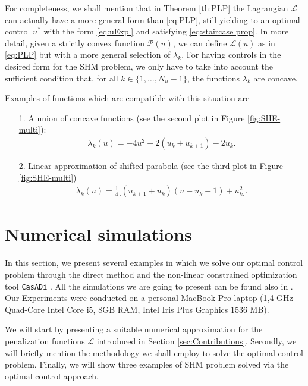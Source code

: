 \documentclass[twocolumn]{autart}    %
\begin{document}
\begin{remark}

For completeness, we shall mention that in Theorem \ref{th:PLP} the Lagrangian $\mathcal L$ can actually have a more general form than \eqref{eq:PLP}, still yielding to an optimal control $u^\ast$ with the form \eqref{eq:uExpl} and satisfying \eqref{eq:staircase prop}. In more detail, given a strictly convex function $\mathcal{P}(u)$, we can define $\mathcal{L}(u)$ as in \eqref{eq:PLP} but with a more general selection of  $\lambda_k$. For having controls in the desired form for the SHM problem, we only have to take into account the sufficient condition that, for all $k \in \{1,\dots,N_u-1\}$, the functions $\lambda_k$ are concave.

Examples of functions which are compatible with this situation are
\begin{enumerate}
    \item[1.] A union of concave functions (see the second plot in Figure \ref{fig:SHE-multi}):
    \begin{align*}
        \lambda_k(u) = -4u^2 + 2(u_k + u_{k+1}) - 2u_{k}.
    \end{align*}
    \item[2.] Linear approximation of shifted parabola (see the third plot in Figure \ref{fig:SHE-multi})
    \begin{align*}
        \lambda_k(u) = \frac 1 4\Big[(u_{k+1}+u_{k}) (u-u_k-1) + u_k^2\Big].
    \end{align*}
\end{enumerate}
\end{remark}
\section{Numerical simulations}\label{sec:Simulations}

In this section, we present several examples in which we solve our optimal control problem through the direct method \cite{rao2009survey} and the non-linear constrained optimization tool \texttt{CasADi} \cite{Andersson2019}. All the simulations we are going to present can be found also in \cite{simus}. Our Experiments were conducted on a personal MacBook Pro laptop (1,4 GHz Quad-Core Intel Core i5, 8GB RAM, Intel Iris Plus
Graphics 1536 MB). 

We will start by presenting a suitable numerical approximation for the penalization functions $\mathcal{L}$ introduced in Section \ref{sec:Contributions}. Secondly, we will briefly mention the methodology we shall employ to solve the optimal control problem. Finally, we will show three examples of SHM problem solved via the optimal control approach.
\end{document}
